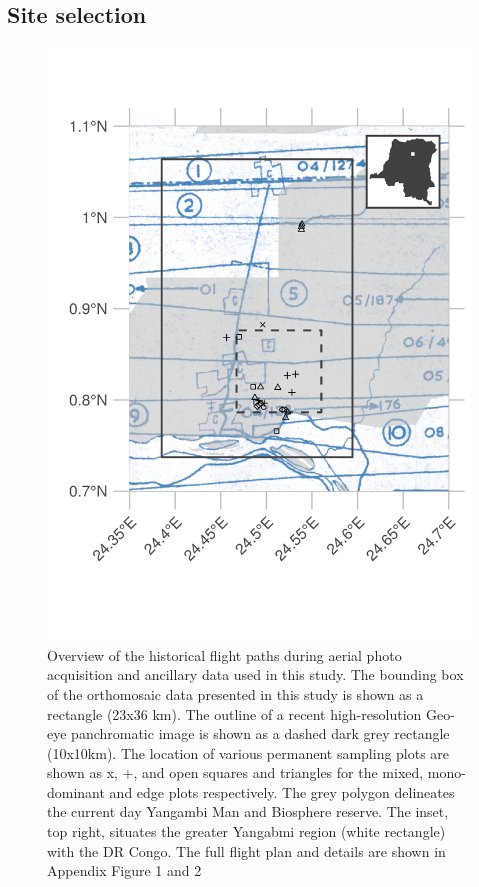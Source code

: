 \documentclass[remote sensing,article,submit,moreauthors,pdftex]{mdpi}
\begin{document}
\hypertarget{site-selection}{%
\subsection{Site selection}\label{site-selection}}

\begin{figure}

{\centering \includegraphics[width=0.75\linewidth]{./figures/flight_paths} 

}

\caption{Overview of the historical flight paths during aerial photo acquisition and ancillary data used in this study. The bounding box of the orthomosaic data presented in this study is shown as a rectangle (23x36 km). The outline of a recent high-resolution Geo-eye panchromatic image is shown as a dashed dark grey rectangle (10x10km). The location of various permanent sampling plots are shown as x, +, and open squares and triangles for the mixed, mono-dominant and edge plots respectively. The grey polygon delineates the current day Yangambi Man and Biosphere reserve. The inset, top right, situates the greater Yangabmi region (white rectangle) with the DR Congo. The full flight plan and details are shown in Appendix Figure 1 and 2}\label{fig:unnamed-chunk-2}
\end{figure}
\end{document}
